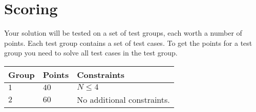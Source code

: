 \section*{Scoring}
Your solution will be tested on a set of test groups, each worth a number of points. Each test group contains
a set of test cases. To get the points for a test group you need to solve all test cases in the test group.

\noindent
\begin{tabular}{| l | l | p{12cm} |}
  \hline
  \textbf{Group} & \textbf{Points} & \textbf{Constraints} \\ \hline
  $1$    & $40$        & $N \leq 4$ \\ \hline
  $2$    & $60$        & No additional constraints. \\ \hline
\end{tabular}
